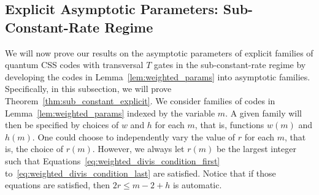\documentclass{article}
\begin{document}
\subsection{Explicit Asymptotic Parameters: Sub-Constant-Rate Regime}\label{subsec:explicit_asymptotic_sub_constant_rate}

We will now prove our results on the asymptotic parameters of explicit families of quantum CSS codes with transversal $T$ gates in the sub-constant-rate regime by developing the codes in Lemma~\ref{lem:weighted_params} into asymptotic families. Specifically, in this subsection, we will prove Theorem~\ref{thm:sub_constant_explicit}. We consider families of codes in Lemma~\ref{lem:weighted_params} indexed by the variable $m$. A given family will then be specified by choices of $w$ and $h$ for each $m$, that is, functions $w(m)$ and $h(m)$. One could choose to independently vary the value of $r$ for each $m$, that is, the choice of $r(m)$. However, we always let $r(m)$ be the largest integer such that Equations~\eqref{eq:weighted_divis_condition_first} to~\eqref{eq:weighted_divis_condition_last} are satisfied. Notice that if those equations are satisfied, then $2r \leq m-2+h$ is automatic.
\end{document}
